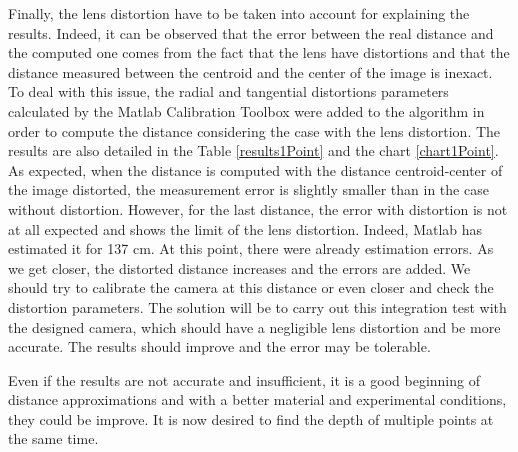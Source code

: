 Finally, the lens distortion have to be taken into account for explaining the results. Indeed, it can be observed that the error between the real distance and the computed one comes from the fact that the lens have distortions and that the distance measured between the centroid and the center of the image is inexact. To deal with this issue, the radial and tangential distortions parameters calculated by the Matlab Calibration Toolbox were added to the algorithm in order to compute the distance considering the case with the lens distortion. The results are also detailed in the Table \ref{results1Point} and the chart \ref{chart1Point}. As expected, when the distance is computed with the distance centroid-center of the image distorted, the measurement error is slightly smaller than in the case without distortion. However, for the last distance, the error with distortion is not at all expected and shows the limit of the lens distortion. Indeed, Matlab has estimated it for 137 cm. At this point, there were already estimation errors. As we get closer, the distorted distance increases and the errors are added. We should try to calibrate the camera at this distance or even closer and check the distortion parameters. The solution will be to carry out this integration test with the designed camera, which should have a negligible lens distortion and be more accurate. The results should improve and the error may be tolerable.

Even if the results are not accurate and insufficient, it is a good beginning of distance approximations and with a better material and experimental conditions, they could be improve. It is now desired to find the depth of multiple points at the same time.